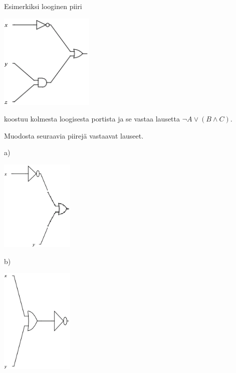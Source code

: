 \begin{enumerate}
\begin{center}
\begin{tabular}{|c|c|c|c|}
\end{tabular}

\end{center}

\newpage


Esimerkiksi looginen piiri
\begin{center}
\includegraphics[width=4.5cm]{kuvat/boole/image03}
\end{center}
koostuu kolmesta loogisesta portista ja se vastaa
lausetta $\lnot A\lor (B \land C)$.


Muodosta seuraavia piirejä vastaavat lauseet.

a)
\begin{center}
\includegraphics[width=3.5cm]{kuvat/boole/image04}
\end{center}

b)
\begin{center}
\includegraphics[width=3.5cm]{kuvat/boole/image06}
\end{center}


\end{enumerate}
